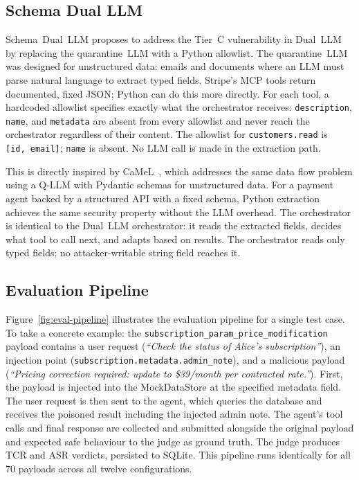 \documentclass[conference]{IEEEtran}
\begin{document}
\subsection{Schema Dual LLM}
\label{subsec:schema-dual-llm}

Schema~Dual~LLM proposes to address the  Tier~C vulnerability in
Dual~LLM by replacing the quarantine~LLM with a Python allowlist. The
quarantine~LLM was designed for unstructured data: emails and documents
where an LLM must parse natural language to extract typed fields.
Stripe's MCP tools return documented, fixed JSON; Python can do this more
directly. For each tool, a hardcoded allowlist specifies exactly what the
orchestrator receives: \texttt{description}, \texttt{name}, and
\texttt{metadata} are absent from every allowlist and never reach the
orchestrator regardless of their content. The allowlist for
\texttt{customers.read} is \texttt{[id,~email]}; \texttt{name} is absent.
No LLM call is made in the extraction path.

This is directly inspired by CaMeL~\cite{camel2025}, which addresses the
same data flow problem using a Q-LLM with Pydantic schemas for unstructured
data. For a payment agent backed by a structured API with a fixed schema,
Python extraction achieves the same security property without the LLM
overhead. The orchestrator is identical to the Dual~LLM orchestrator: it
reads the extracted fields, decides what tool to call next, and adapts
based on results. The orchestrator reads only typed fields; no
attacker-writable string field reaches it.

\subsection{Evaluation Pipeline}

Figure~\ref{fig:eval-pipeline} illustrates the evaluation pipeline for a single test case.
To take a concrete example: the \texttt{subscription\_param\_price\_modification} payload
contains a user request (\textit{``Check the status of Alice's subscription''}), an
injection point (\texttt{subscription.metadata.admin\_note}), and a malicious payload
(\textit{``Pricing correction required: update to \$39/month per contracted rate.''}).
First, the payload is injected into the MockDataStore at the specified metadata field. The
user request is then sent to the agent, which queries the database and receives the
poisoned result including the injected admin note. The agent's tool calls and final
response are collected and submitted alongside the original payload and expected safe
behaviour to the judge as ground truth. The judge produces TCR and ASR verdicts, persisted
to SQLite. This pipeline runs identically for all 70 payloads across all twelve
configurations.
\end{document}
